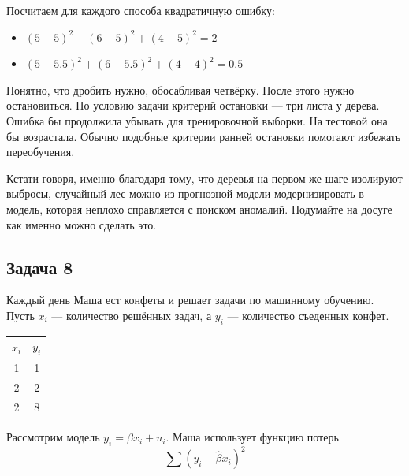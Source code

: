 \documentclass[12pt, a4paper, oneside]{article}
\begin{document}
{Посчитаем для каждого способа квадратичную ошибку: 

\begin{itemize}
	\item  $ (5 - 5)^2 + (6 - 5)^2 + (4 - 5)^2 = 2$
	\item  $ (5 - 5.5)^2 + (6 - 5.5)^2 + (4 - 4)^2  = 0.5$
\end{itemize}
	
Понятно, что дробить нужно, обосабливая четвёрку. После этого нужно остановиться. По условию задачи критерий остановки --- три листа у дерева. Ошибка бы продолжила убывать для тренировочной выборки. На тестовой она бы возрастала. Обычно подобные критерии ранней остановки помогают избежать переобучения.
	
Кстати говоря, именно благодаря тому, что деревья на первом же шаге изолируют выбросы, случайный лес можно из прогнозной модели модернизировать в модель, которая неплохо справляется с поиском аномалий. Подумайте на досуге как именно можно сделать это. 
}



\subsection*{Задача 8}

Каждый день Маша ест конфеты и решает задачи по машинному обучению. Пусть $x_i$ — количество решённых задач, а $y_i$ — количество съеденных конфет.

\begin{center}
\begin{tabular}{c|c}
	\hline
	$x_i$ & $y_i$ \\
	\hline
	1 & 1 \\
	2 & 2 \\
	2 & 8 \\
\end{tabular}
\end{center}

Рассмотрим модель $y_i = \beta x_i + u_i$. Маша использует функцию потерь 
\[
\sum (y_i - \hat \beta x_i )^2
\]
\end{document}

